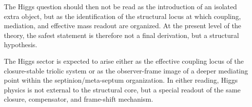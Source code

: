 The Higgs question should then not be read as the introduction of an isolated
extra object, but as the identification of the structural locus at which
coupling, mediation, and effective mass readout are organized. At the present
level of the theory, the safest statement is therefore not a final derivation,
but a structural hypothesis.

\begin{remark}
\label{rem:structural-higgs-role}
The Higgs sector is expected to arise either as the effective coupling locus of
the closure-stable triolic system or as the observer-frame image of a deeper
mediating point within the septinion/meta-septum organization. In either
reading, Higgs physics is not external to the structural core, but a special
readout of the same closure, compensator, and frame-shift mechanism.
\end{remark}




